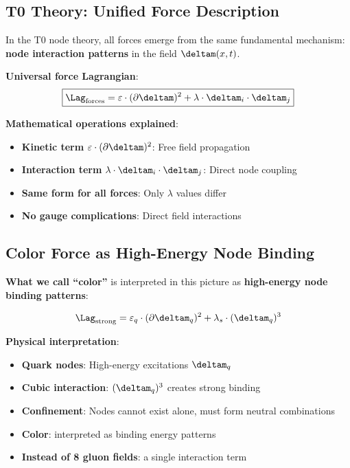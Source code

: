 	\subsection{T0 Theory: Unified Force Description}
	
	In the T0 node theory, all forces emerge from the same fundamental mechanism: \textbf{node interaction patterns} in the field $\deltam(x,t)$.
	
	\textbf{Universal force Lagrangian}:
	\begin{equation}
		\boxed{\Lag_{\text{forces}} = \varepsilon \cdot (\partial \deltam)^2 + \lambda \cdot \deltam_i \cdot \deltam_j}
	\end{equation}
	
	\textbf{Mathematical operations explained}:
	\begin{itemize}
		\item \textbf{Kinetic term} $\varepsilon \cdot (\partial \deltam)^2$: Free field propagation
		\item \textbf{Interaction term} $\lambda \cdot \deltam_i \cdot \deltam_j$: Direct node coupling
		\item \textbf{Same form for all forces}: Only $\lambda$ values differ
		\item \textbf{No gauge complications}: Direct field interactions
	\end{itemize}
	
	\subsection{Color Force as High-Energy Node Binding}
	
	\textbf{What we call ``color''} is interpreted in this picture as \textbf{high-energy node binding patterns}:
	
	\begin{equation}
		\Lag_{\text{strong}} = \varepsilon_q \cdot (\partial \deltam_q)^2 + \lambda_s \cdot (\deltam_q)^3
	\end{equation}
	
	\textbf{Physical interpretation}:
	\begin{itemize}
		\item \textbf{Quark nodes}: High-energy excitations $\deltam_q$ 
		\item \textbf{Cubic interaction}: $(\deltam_q)^3$ creates strong binding
		\item \textbf{Confinement}: Nodes cannot exist alone, must form neutral combinations
		\item \textbf{Color}: interpreted as binding energy patterns
		\item \textbf{Instead of 8 gluon fields}: a single interaction term
	\end{itemize}
	
